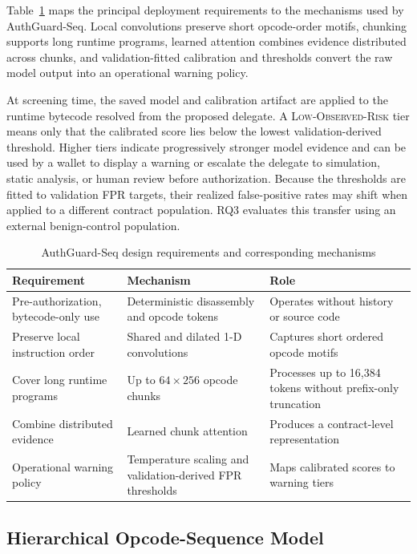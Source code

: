 \documentclass[conference]{IEEEtran}
\begin{document}
Table~\ref{tab:design-map} maps the principal deployment requirements to the mechanisms used by AuthGuard-Seq. Local convolutions preserve short opcode-order motifs, chunking supports long runtime programs, learned attention combines evidence distributed across chunks, and validation-fitted calibration and thresholds convert the raw model output into an operational warning policy.



At screening time, the saved model and calibration artifact are applied to the runtime bytecode resolved from the proposed delegate. A \textsc{Low-Observed-Risk} tier means only that the calibrated score lies below the lowest validation-derived threshold.  Higher tiers indicate progressively stronger model evidence and can be used by a wallet to display a warning or escalate the delegate to simulation, static analysis, or human review before authorization. Because the thresholds are fitted to validation FPR targets, their realized false-positive rates may shift when applied to a different contract population. RQ3 evaluates this transfer using an external benign-control population.



\begin{table}[t]
\centering
\caption{AuthGuard-Seq design requirements and corresponding mechanisms}
\label{tab:design-map}
\scriptsize
\begin{tabularx}{\columnwidth}{@{}X X X@{}}
\toprule
Requirement & Mechanism & Role \\
\midrule
Pre-authorization, bytecode-only use & Deterministic disassembly and opcode tokens & Operates without history or source code \\
Preserve local instruction order & Shared and dilated 1-D convolutions & Captures short ordered opcode motifs \\
Cover long runtime programs & Up to $64\times256$ opcode chunks & Processes up to 16,384 tokens without prefix-only truncation \\
Combine distributed evidence & Learned chunk attention & Produces a contract-level representation \\
Operational warning policy & Temperature scaling and validation-derived FPR thresholds & Maps calibrated scores to warning tiers \\
\bottomrule
\end{tabularx}
\end{table}



\subsection{Hierarchical Opcode-Sequence Model}
\end{document}
